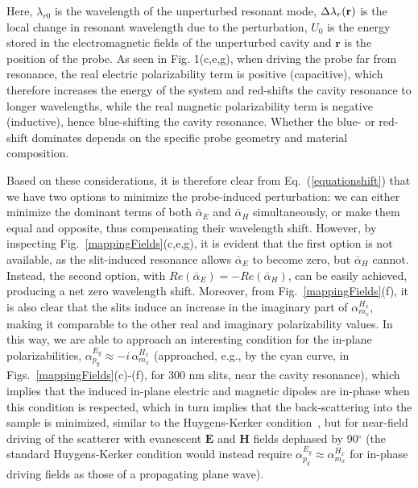 \documentclass{osa-article}
\begin{document}
	Here, $\lambda_{r0}$ is the wavelength of the unperturbed resonant mode, $\Delta \lambda_{r}(\bf{r})$ is the local change in resonant wavelength due to the perturbation, $U_{0}$ is the energy stored in the electromagnetic fields of the unperturbed cavity and $\bm{r}$ is the position of the probe. As seen in Fig. 1(c,e,g), when driving the probe far from resonance, the real electric polarizability term is positive (capacitive), which therefore increases the energy of the system and red-shifts the cavity resonance to longer wavelengths, while the real magnetic polarizability term is negative (inductive), hence blue-shifting the cavity resonance. Whether the blue- or red-shift dominates depends on the specific probe geometry and material composition.\par
	
	Based on these considerations, it is therefore clear from Eq.~(\ref{equationshift}) that we have two options to minimize the probe-induced perturbation: we can either minimize the dominant terms of both $\bar {\alpha }_{E}$ and $\bar {\alpha }_{H}$ simultaneously, or make them equal and opposite, thus compensating their wavelength shift. However, by inspecting Fig.~\ref{mappingFields}(c,e,g), it is evident that the first option is not available, as the slit-induced resonance allows $\bar {\alpha }_{E}$ to become zero, but $\bar {\alpha }_{H}$ cannot. Instead, the second option, with $Re(\bar{\alpha }_{E})=-Re(\bar {\alpha }_{H})$, can be easily achieved, producing a net zero wavelength shift. Moreover, from Fig.~\ref{mappingFields}(f), it is also clear that the slits induce an increase in the imaginary part of $\alpha^{H_{x}}_{m_{x}}$, making it comparable to the other real and imaginary polarizability values. In this way, we are able to approach an interesting condition for the in-plane polarizabilities, $\alpha^{E_{y}}_{p_{y}} \approx -i \, \alpha^{H_{x}}_{m_{x}}$ (approached, e.g., by the cyan curve, in Figs.~\ref{mappingFields}(c)-(f), for 300 nm slits, near the cavity resonance), which implies that the induced in-plane electric and magnetic dipoles are in-phase when this condition is respected, which in turn implies that the back-scattering into the sample is minimized, similar to the Huygens-Kerker condition~\cite{Kerker_1975,Alukerker_2010,picardi2018janus,picardi2019experimental}, but for near-field driving of the scatterer with evanescent $\bm{E}$ and $\bm{H}$ fields dephased by 90$^{\circ}$ \cite{wei2018directional} (the standard Huygens-Kerker condition would instead require $\alpha^{E_{y}}_{p_{y}} \approx \alpha^{H_{x}}_{m_{x}}$ for in-phase driving fields as those of a propagating plane wave). %
\end{document}
